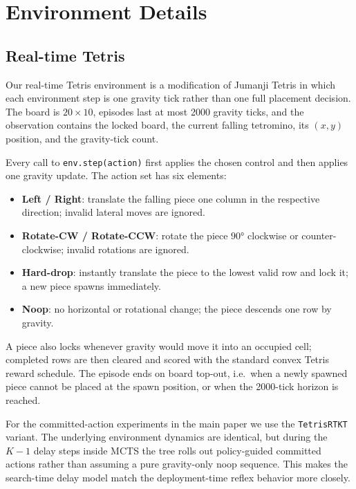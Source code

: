 \documentclass{article}
\begin{document}
\section{Environment Details}
\label{app:envs}

\subsection{Real-time Tetris}
\label{app:envs_tetris}

Our real-time Tetris environment is a modification of Jumanji Tetris in which each
environment step is one gravity tick rather than one full placement decision.
The board is $20 \times 10$, episodes last at most 2000 gravity ticks, and the
observation contains the locked board, the current falling tetromino, its
$(x,y)$ position, and the gravity-tick count.

Every call to \texttt{env.step(action)} first applies the chosen control and then
applies one gravity update. The action set has six elements:
\begin{itemize}[nosep]
  \item \textbf{Left / Right}: translate the falling piece one column in the respective
    direction; invalid lateral moves are ignored.
  \item \textbf{Rotate-CW / Rotate-CCW}: rotate the piece $90°$ clockwise or
    counter-clockwise; invalid rotations are ignored.
  \item \textbf{Hard-drop}: instantly translate the piece to the lowest valid row and
    lock it; a new piece spawns immediately.
  \item \textbf{Noop}: no horizontal or rotational change; the piece descends one row
    by gravity.
\end{itemize}
A piece also locks whenever gravity would move it into an occupied cell; completed
rows are then cleared and scored with the standard convex Tetris reward schedule.
The episode ends on board top-out, i.e.\ when a newly spawned piece cannot be placed
at the spawn position, or when the 2000-tick horizon is reached.

For the committed-action experiments in the main paper we use the \texttt{TetrisRTKT}
variant. The underlying environment dynamics are identical, but during the $K{-}1$
delay steps inside MCTS the tree rolls out policy-guided committed actions rather
than assuming a pure gravity-only noop sequence. This makes the search-time delay
model match the deployment-time reflex behavior more closely.
\end{document}
